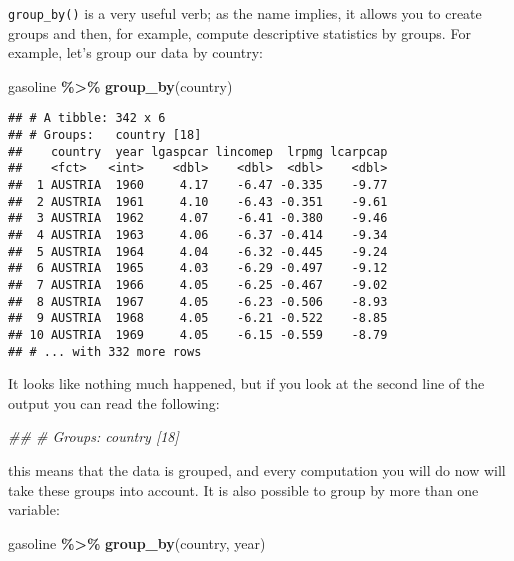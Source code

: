 \documentclass[
]{article}
\newenvironment{Shaded}{\begin{snugshade}}{\end{snugshade}}
\newcommand{\CommentTok}[1]{\textcolor[rgb]{0.56,0.35,0.01}{\textit{#1}}}
\newcommand{\KeywordTok}[1]{\textcolor[rgb]{0.13,0.29,0.53}{\textbf{#1}}}
\newcommand{\NormalTok}[1]{#1}
\newcommand{\OperatorTok}[1]{\textcolor[rgb]{0.81,0.36,0.00}{\textbf{#1}}}
\newcommand{\StringTok}[1]{\textcolor[rgb]{0.31,0.60,0.02}{#1}}
\begin{document}
\texttt{group\_by()} is a very useful verb; as the name implies, it allows you to create groups and then,
for example, compute descriptive statistics by groups. For example, let's group our data by
country:

\begin{Shaded}
\begin{Highlighting}[]
\NormalTok{gasoline }\OperatorTok{\%\textgreater{}\%}\StringTok{ }\KeywordTok{group\_by}\NormalTok{(country)}
\end{Highlighting}
\end{Shaded}

\begin{verbatim}
## # A tibble: 342 x 6
## # Groups:   country [18]
##    country  year lgaspcar lincomep  lrpmg lcarpcap
##    <fct>   <int>    <dbl>    <dbl>  <dbl>    <dbl>
##  1 AUSTRIA  1960     4.17    -6.47 -0.335    -9.77
##  2 AUSTRIA  1961     4.10    -6.43 -0.351    -9.61
##  3 AUSTRIA  1962     4.07    -6.41 -0.380    -9.46
##  4 AUSTRIA  1963     4.06    -6.37 -0.414    -9.34
##  5 AUSTRIA  1964     4.04    -6.32 -0.445    -9.24
##  6 AUSTRIA  1965     4.03    -6.29 -0.497    -9.12
##  7 AUSTRIA  1966     4.05    -6.25 -0.467    -9.02
##  8 AUSTRIA  1967     4.05    -6.23 -0.506    -8.93
##  9 AUSTRIA  1968     4.05    -6.21 -0.522    -8.85
## 10 AUSTRIA  1969     4.05    -6.15 -0.559    -8.79
## # ... with 332 more rows
\end{verbatim}

It looks like nothing much happened, but if you look at the second line of the output you can read
the following:

\begin{Shaded}
\begin{Highlighting}[]
\CommentTok{\#\# \# Groups:   country [18]}
\end{Highlighting}
\end{Shaded}

this means that the data is grouped, and every computation you will do now will take these groups
into account. It is also possible to group by more than one variable:

\begin{Shaded}
\begin{Highlighting}[]
\NormalTok{gasoline }\OperatorTok{\%\textgreater{}\%}\StringTok{ }\KeywordTok{group\_by}\NormalTok{(country, year)}
\end{Highlighting}
\end{Shaded}
\end{document}
